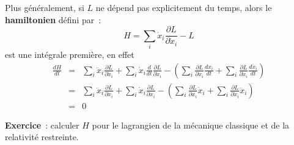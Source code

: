 \documentclass[a4paper,11pt]{article}
\begin{document}
\begin{giacjshere}
Plus g\'en\'eralement, si $L$ ne d\'epend pas explicitement du temps,
alors le {\bf hamiltonien} d\'efini par~:
$$ H = \sum_i \dot{x}_i \frac{\partial L}{\partial \dot{x}_i} - L$$
est une int\'egrale premi\`ere, en effet
\begin{eqnarray*}
\frac{dH}{dt} &= &\sum_i \ddot{x}_i \frac{\partial L}{\partial
  \dot{x}_i} + \sum_i \dot{x}_i \frac{d}{dt}\frac{\partial
  L}{\partial \dot{x}_i}
- \left(\sum_i \frac{\partial L}{\partial x_i} \frac{dx_i}{dt}
+\sum_i \frac{\partial L}{\partial \dot{x}_i} \frac{d\dot{x}_i}{dt}
\right)\\
& =& 
\sum_i \ddot{x}_i \frac{\partial L}{\partial
  \dot{x}_i} + \sum_i \dot{x}_i \frac{\partial  L}{\partial x_i}
- \left(\sum_i \frac{\partial L}{\partial x_i} \dot{x}_i
+\sum_i \frac{\partial L}{\partial \dot{x}_i} \ddot{x}_i
\right) \\
&=&0
\end{eqnarray*}

{\bf Exercice}~: calculer $H$ pour le lagrangien de la m\'ecanique
classique et de la relativit\'e restreinte.


\end{giacjshere}
\end{document}
